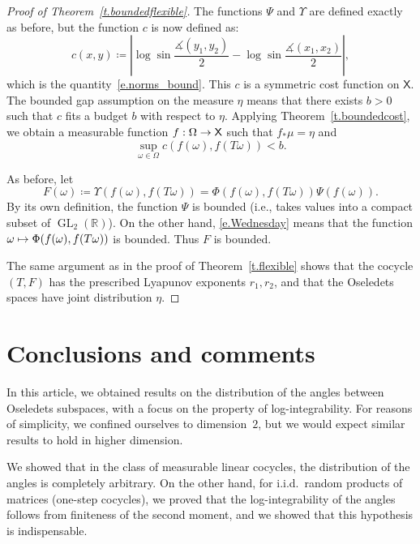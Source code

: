 \documentclass[10pt]{amsart}
\theoremstyle{definition}\newtheorem{defi}[theo]{Definition}\newtheorem{rema}[theo]{Remark}\newtheorem{exam}[theo]{Example}\newtheorem{exem}[theo]{Example}\newtheorem{nota}[theo]{Notation}
\newcommand{\R}{\mathbb{R}}
\newcommand{\sfX}{\mathsf{X}}
\DeclareMathOperator{\GL}{GL}
\renewcommand{\angle}{\measuredangle}
\renewcommand*{\to}{\mathchoice{\longrightarrow}{\rightarrow}{\rightarrow}{\rightarrow}}
\let\oldmapsto\mapsto
\renewcommand*{\mapsto}{\mathchoice{\longmapsto}{\oldmapsto}{\oldmapsto}{\oldmapsto}}
\begin{document}
\begin{proof}[Proof of Theorem~\ref{t.boundedflexible}]
The functions $\Psi$ and $\Upsilon$ are defined exactly as before, but the function $c$ is now defined as:
\begin{equation}
c(x,y) \coloneqq \left| \log \sin \frac{\angle(y_1,y_2)}{2} - \log \sin \frac{\angle(x_1,x_2)}{2} \right|,
\end{equation}
which is the quantity~\eqref{e.norms_bound}. This $c$ is a symmetric cost function on $\sfX$. The bounded gap assumption on the measure $\eta$ means that there exists $b>0$ such that $c$ fits a budget $b$ with respect to $\eta$. Applying Theorem~\ref{t.boundedcost}, we obtain a measurable function $f:\Omega \to \sfX$ such that $f_*\mu = \eta$ and
\begin{equation}\label{e.Wednesday}
\sup_{\omega \in \Omega} c(f(\omega),f(T\omega)) < b.
\end{equation}

As before, let
\begin{equation}
F(\omega) \coloneqq \Upsilon(f(\omega),f(T \omega)) = \Phi(f(\omega),f(T \omega)) \Psi(f(\omega)).
\end{equation}
By its own definition, the function $\Psi$ is bounded (i.e., takes values into a compact subset of $\GL_2(\R)$). On the other hand, \eqref{e.Wednesday} means that the function $\omega \mapsto \Phi(f(\omega),\linebreak f(T \omega))$ is bounded. Thus $F$ is bounded.

The same argument as in the proof of Theorem~\ref{t.flexible} shows that the cocycle $(T,F)$ has the prescribed Lyapunov exponents $r_1,r_2$, and that the Oseledets spaces have joint distribution $\eta$.
\end{proof}

\section{Conclusions and comments} \label{s.conclusion}


In this article, we obtained results on the distribution of the angles between Oseledets subspaces, with a focus on the property of log-integrability. For reasons of simplicity, we confined ourselves to dimension~$2$, but we would expect similar results to hold in higher dimension.

We showed that in the class of measurable linear cocycles, the distribution of the angles is completely arbitrary. On the other hand, for i.i.d.\ random products of matrices (one-step cocycles), we proved that the log-integrability of the angles follows from finiteness of the second moment, and we showed that this hypothesis is indispensable.
\end{document}
